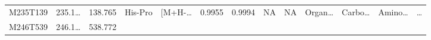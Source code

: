 \documentclass[
]{article}
\begin{document}
\begin{longtable}[]{@{}lllllllllllll@{}}
\begin{minipage}[t]{0.05\columnwidth}
M235T139\strut
\end{minipage} & \begin{minipage}[t]{0.05\columnwidth}\raggedright
235.1\ldots{}\strut
\end{minipage} & \begin{minipage}[t]{0.05\columnwidth}\raggedright
138.765\strut
\end{minipage} & \begin{minipage}[t]{0.05\columnwidth}\raggedright
His-Pro\strut
\end{minipage} & \begin{minipage}[t]{0.05\columnwidth}\raggedright
{[}M+H-\ldots{}\strut
\end{minipage} & \begin{minipage}[t]{0.07\columnwidth}\raggedright
0.9955\strut
\end{minipage} & \begin{minipage}[t]{0.07\columnwidth}\raggedright
0.9994\strut
\end{minipage} & \begin{minipage}[t]{0.05\columnwidth}\raggedright
NA\strut
\end{minipage} & \begin{minipage}[t]{0.04\columnwidth}\raggedright
NA\strut
\end{minipage} & \begin{minipage}[t]{0.05\columnwidth}\raggedright
Organ\ldots{}\strut
\end{minipage} & \begin{minipage}[t]{0.05\columnwidth}\raggedright
Carbo\ldots{}\strut
\end{minipage} & \begin{minipage}[t]{0.05\columnwidth}\raggedright
Amino\ldots{}\strut
\end{minipage} & \begin{minipage}[t]{0.02\columnwidth}\raggedright
\ldots{}\strut
\end{minipage}\tabularnewline
\begin{minipage}[t]{0.05\columnwidth}\raggedright
M246T539\strut
\end{minipage} & \begin{minipage}[t]{0.05\columnwidth}\raggedright
246.1\ldots{}\strut
\end{minipage} & \begin{minipage}[t]{0.05\columnwidth}\raggedright
538.772\strut
\end{minipage} & \begin{minipage}[t]{0.05\columnwidth}\raggedright

\end{minipage}
\end{longtable}
\end{document}
